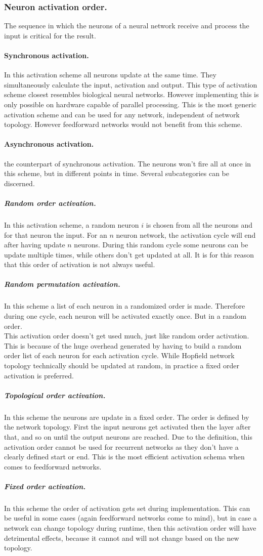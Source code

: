 \documentclass[pdftex,a4paper,12pt,twoside]{report}
\theoremstyle{plain} \newtheorem{theorem}{Theorem} \newtheorem{proposition}{Proposition} \newtheorem{lemma}{Lemma} \newtheorem*{corollary}{Corollary}
\theoremstyle{definition} \newtheorem{definition}{Definition} \newtheorem{conjecture}{Conjecture} \newtheorem*{example}{Example} \newtheorem{algorithm}{Algorithm}
\theoremstyle{remark} \newtheorem*{remark}{Remark} \newtheorem*{note}{Note} \newtheorem{case}{Case}
\begin{document}
\subsubsection{Neuron activation order.}
The sequence in which the neurons of a neural network receive and process the input is critical for the result.
\paragraph{Synchronous activation.}
In this activation scheme all neurons update at the same time. They simultaneously calculate the input, activation and output. This type of activation scheme closest resembles biological neural networks. However implementing this is only possible on hardware capable of parallel processing. This is the most generic activation scheme and can be used for any network, independent of network topology. However feedforward networks would not benefit from this scheme.
\paragraph{Asynchronous activation.}
the counterpart of synchronous activation. The neurons won't fire all at once in this scheme, but in different points in time. Several subcategories can be discerned. 
\subparagraph{Random order activation.}
In this activation scheme, a random neuron $i$ is chosen from all the neurons and for that neuron the input. For an $n$ neuron network, the activation cycle will end after having update $n$ neurons. During this random cycle some neurons can be update multiple times, while others don't get updated at all. It is for this reason that this order of activation is not always useful.
\subparagraph{Random permutation activation.}
In this scheme a list of each neuron in a randomized order is made. Therefore during one cycle, each neuron will be activated exactly once. But in a random order.\\
This activation order doesn't get used much, just like random order activation. This is because of the huge overhead generated by having to build a random order list of each neuron for each activation cycle. While Hopfield network topology technically should be updated at random, in practice a fixed order activation is preferred.
\subparagraph{Topological order activation.}
In this scheme the neurons are update in a fixed order. The order is defined by the network topology. First the input neurons get activated then the layer after that, and so on until the output neurons are reached. Due to the definition, this activation order cannot be used for recurrent networks as they don't have a clearly defined start or end. This is the most efficient activation schema when comes to feedforward networks.
\subparagraph{Fixed order activation.}
In this scheme the order of activation gets set during implementation. This can be useful in some cases (again feedforward networks come to mind), but in case a network can change topology during runtime, then this activation order will have detrimental effects, because it cannot and will not change based on the new topology.
\end{document}
